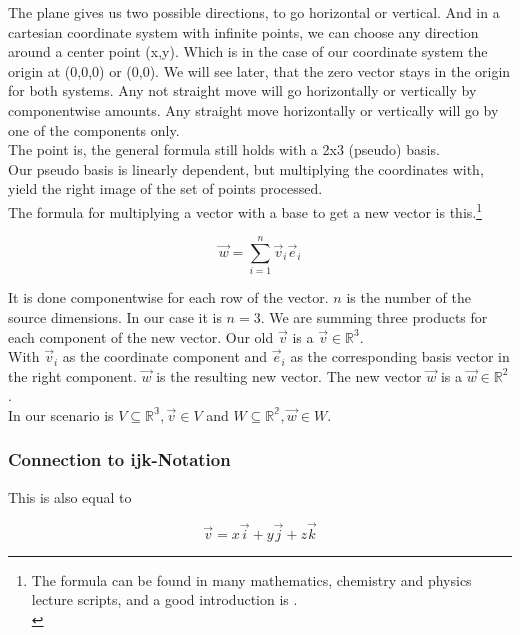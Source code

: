 \documentclass[a4paper]{article}
\begin{document}
The plane gives us two possible directions, to go horizontal or vertical. And in a cartesian coordinate system with infinite points, we can choose any direction around a center point (x,y). Which is in the case of our coordinate system the origin at (0,0,0) or (0,0). We will see later, that the zero vector stays in the origin for both systems.
Any not straight move will go horizontally or vertically by componentwise amounts. Any straight move horizontally or vertically will go by one of the components only.\\

The point is, the general formula still holds with a 2x3 (pseudo) basis.\\

Our pseudo basis is linearly dependent, but multiplying the coordinates with, yield the right image of the set of points processed.\\

The formula for multiplying a vector with a base to get a new vector is this.\footnote{The formula can be found in many mathematics, chemistry and physics lecture scripts, and a good introduction is \cite{Strang1}.\\}

\begin{displaymath}
\vec{w} = \displaystyle\sum_{i=1}^{n} \vec{v}_i\vec{e}_i
\end{displaymath}

It is done componentwise for each row of the vector. $n$ is the number of the source dimensions. In our case it is $n = 3$. 
We are summing three products for each component of the new vector. Our old $\vec{v}$ is a $\vec{v} \in \mathbb{R}^3$.\\
With $\vec{v}_i$ as the coordinate component and $\vec{e}_i$ as the corresponding basis vector in the right component. 
$\vec{w}$ is the resulting new vector.  The new vector $\vec{w}$ is a $\vec{w} \in \mathbb{R}^2$.\\

In our scenario is $V \subseteq \mathbb{R^{3}}, \vec{v} \in V$ and $W \subseteq \mathbb{R^{2}}, \vec{w} \in W$.

\subsubsection{Connection to ijk-Notation}

This is also equal to

\begin{displaymath}
\vec{v} = x\vec{i} + y\vec{j} + z\vec{k}
\end{displaymath}
\end{document}
